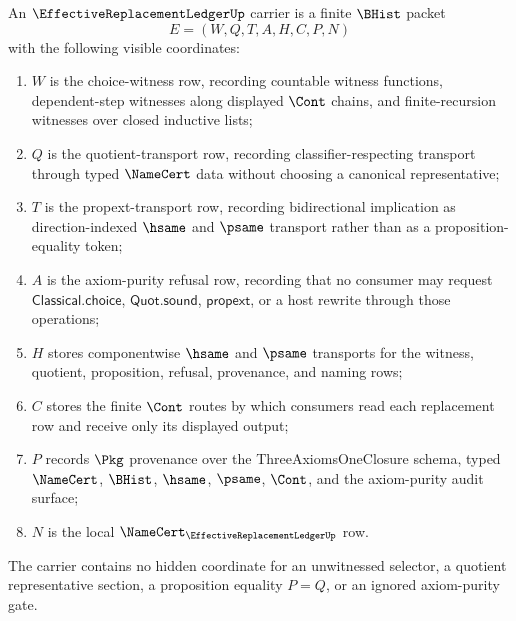 \begin{definition}
\label{def:effective-replacement-ledger-carrier}
An $\EffectiveReplacementLedgerUp$ carrier is a finite $\BHist$ packet
$$
E=(W,Q,T,A,H,C,P,N)
$$
with the following visible coordinates:
\begin{enumerate}
\item $W$ is the choice-witness row, recording countable witness functions, dependent-step witnesses along displayed $\Cont$ chains, and finite-recursion witnesses over closed inductive lists;
\item $Q$ is the quotient-transport row, recording classifier-respecting transport through typed $\NameCert$ data without choosing a canonical representative;
\item $T$ is the propext-transport row, recording bidirectional implication as direction-indexed $\hsame$ and $\psame$ transport rather than as a proposition-equality token;
\item $A$ is the axiom-purity refusal row, recording that no consumer may request $\mathsf{Classical.choice}$, $\mathsf{Quot.sound}$, $\mathsf{propext}$, or a host rewrite through those operations;
\item $H$ stores componentwise $\hsame$ and $\psame$ transports for the witness, quotient, proposition, refusal, provenance, and naming rows;
\item $C$ stores the finite $\Cont$ routes by which consumers read each replacement row and receive only its displayed output;
\item $P$ records $\Pkg$ provenance over the ThreeAxiomsOneClosure schema, typed $\NameCert$, $\BHist$, $\hsame$, $\psame$, $\Cont$, and the axiom-purity audit surface;
\item $N$ is the local $\NameCert_{\EffectiveReplacementLedgerUp}$ row.
\end{enumerate}
The carrier contains no hidden coordinate for an unwitnessed selector, a quotient representative section, a proposition equality $P=Q$, or an ignored axiom-purity gate.
\end{definition}

